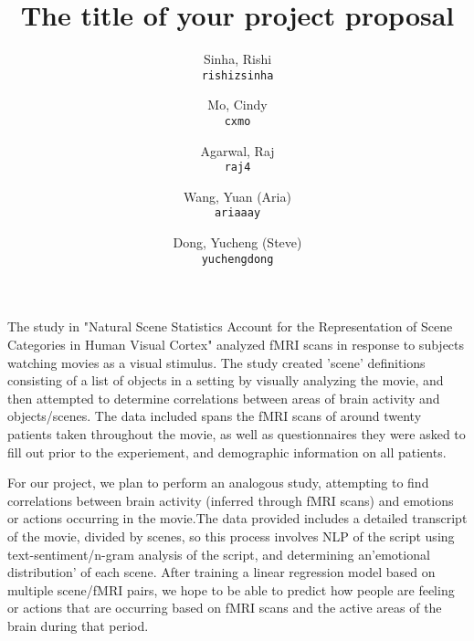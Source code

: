 \documentclass[11pt]{article}
\title{The title of your project proposal}
\author{
  Sinha, Rishi\\
  \texttt{rishizsinha}
  \and
  Mo, Cindy\\
  \texttt{cxmo}
  \and
  Agarwal, Raj\\
  \texttt{raj4}
  \and
  Wang, Yuan (Aria)\\
  \texttt{ariaaay}
  \and
  Dong, Yucheng (Steve)\\
  \texttt{yuchengdong}
}
\begin{document}
\maketitle

The study in "Natural Scene Statistics Account for the Representation of 
Scene Categories in Human Visual Cortex"\cite{stansbury2013neuron} analyzed 
fMRI scans in response to subjects watching movies as a visual stimulus.
The study created 'scene' definitions consisting of a list of objects in 
a setting by visually analyzing the movie, and then attempted to determine 
correlations between areas of brain activity and objects/scenes. The data 
included spans the fMRI scans of around twenty patients taken throughout
the movie, as well as questionnaires they were asked to fill out prior
to the experiement, and demographic information on all patients.

For our project, we plan to perform an analogous study, attempting to find
correlations between brain activity (inferred through fMRI scans) and 
emotions or actions occurring in the movie.The data provided includes 
a detailed transcript of the movie, divided by scenes, so this process 
involves NLP of the script using text-sentiment/n-gram analysis of the 
script, and determining an'emotional distribution' of each scene. After 
training a linear regression model based on multiple scene/fMRI pairs, we 
hope to be able to predict how people are feeling or actions that are 
occurring based on fMRI scans and the active areas of the brain during that 
period. 


\end{document}
